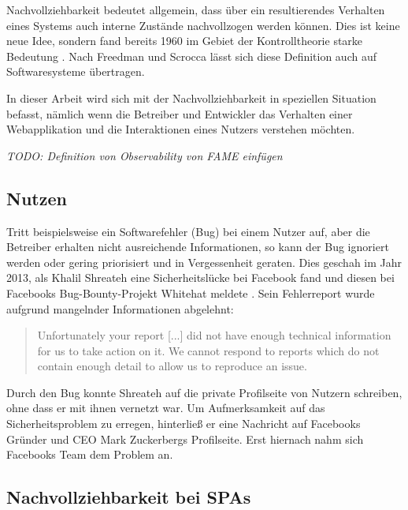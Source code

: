Nachvollziehbarkeit bedeutet allgemein, dass über ein resultierendes Verhalten eines Systems auch interne Zustände nachvollzogen werden können. Dies ist keine neue Idee, sondern fand bereits 1960 im Gebiet der Kontrolltheorie starke Bedeutung \cite{OnTheGeneralTheoryOfControlSystems}. Nach Freedman \cite{TestabilityOfSoftwareComponents} und Scrocca \etal \cite{EnablingEventDrivenObservability} lässt sich diese Definition auch auf Softwaresysteme übertragen.
	
In dieser Arbeit wird sich mit der Nachvollziehbarkeit in speziellen Situation befasst, nämlich wenn die Betreiber und Entwickler das Verhalten einer Webapplikation und die Interaktionen eines Nutzers verstehen möchten.%

\textit{\color{red}TODO: Definition von Observability von FAME einfügen}
	
\subsection{Nutzen}
	
Tritt beispielsweise ein Softwarefehler (Bug) bei einem Nutzer auf, aber die Betreiber erhalten nicht ausreichende Informationen, so kann der Bug ignoriert werden oder gering priorisiert und in Vergessenheit geraten. Dies geschah im Jahr 2013, als Khalil Shreateh eine Sicherheitslücke bei Facebook fand und diesen bei Facebooks Bug-Bounty-Projekt Whitehat meldete \cite{FacebookBugBounyHunt}. Sein Fehlerreport wurde aufgrund mangelnder Informationen abgelehnt:
	
\begin{quotation}
Unfortunately your report [...] did not have enough technical information for us to take action  on  it. We  cannot  respond  to  reports  which  do  not contain enough detail to allow us to reproduce an issue.
\end{quotation}
	
Durch den Bug konnte Shreateh auf die private Profilseite von Nutzern schreiben, ohne dass er mit ihnen vernetzt war. Um Aufmerksamkeit auf das Sicherheitsproblem zu erregen, hinterließ er eine Nachricht auf Facebooks Gründer und CEO Mark Zuckerbergs Profilseite. Erst hiernach nahm sich Facebooks Team dem Problem an.
	
\subsection{Nachvollziehbarkeit bei SPAs}
	

